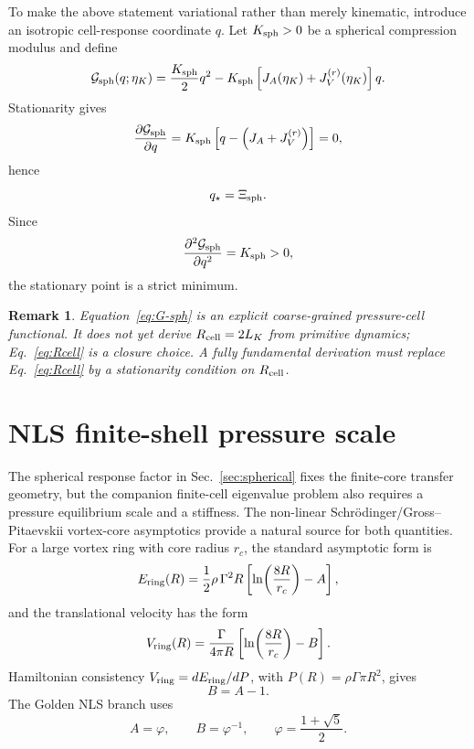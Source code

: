 \documentclass[11pt]{article}
\newcommand{\Xisph}{\Xi_{\rm sph}}
\newtheorem{remark}{Remark}
\begin{document}
To make the above statement variational rather than merely kinematic, introduce an isotropic
cell-response coordinate \(q\).  Let \(K_{\rm sph}>0\) be a spherical compression modulus and
define
\begin{equation}
  \mathcal G_{\rm sph}(q;\eta_K)
  =
  \frac{K_{\rm sph}}{2}q^2
  -
  K_{\rm sph}\left[J_A(\eta_K)+J_V^{(r)}(\eta_K)\right]q.
  \label{eq:G-sph}
\end{equation}
Stationarity gives
\begin{equation}
  \frac{\partial\mathcal G_{\rm sph}}{\partial q}
  =
  K_{\rm sph}
  \left[
  q-\left(J_A+J_V^{(r)}\right)
  \right]
  =
  0,
\end{equation}
hence
\begin{equation}
  q_\star=\Xisph.
\end{equation}
Since
\begin{equation}
  \frac{\partial^2\mathcal G_{\rm sph}}{\partial q^2}=K_{\rm sph}>0,
\end{equation}
the stationary point is a strict minimum.

\begin{remark}
Equation~\eqref{eq:G-sph} is an explicit coarse-grained pressure-cell functional.  It does not
yet derive \(R_{\rm cell}=2L_K\) from primitive dynamics; Eq.~\eqref{eq:Rcell} is a closure
choice.  A fully fundamental derivation must replace Eq.~\eqref{eq:Rcell} by a stationarity
condition on \(R_{\rm cell}\).
\end{remark}


\section{NLS finite-shell pressure scale}
\label{sec:nls-shell}

The spherical response factor in Sec.~\ref{sec:spherical} fixes the finite-core transfer
geometry, but the companion finite-cell eigenvalue problem also requires a pressure
equilibrium scale and a stiffness.  The non-linear Schrödinger/Gross--Pitaevskii vortex-core
asymptotics provide a natural source for both quantities.  For a large vortex ring with core
radius \(r_c\), the standard asymptotic form is
\begin{equation}
  E_{\rm ring}(R)
  =
  \frac{1}{2}\rho\,\Gamma^2 R
  \left[
    \ln\!\left(\frac{8R}{r_c}\right)-A
  \right],
  \label{eq:nls-ring-energy}
\end{equation}
and the translational velocity has the form
\begin{equation}
  V_{\rm ring}(R)
  =
  \frac{\Gamma}{4\pi R}
  \left[
    \ln\!\left(\frac{8R}{r_c}\right)-B
  \right].
  \label{eq:nls-ring-velocity}
\end{equation}
Hamiltonian consistency \(V_{\rm ring}=dE_{\rm ring}/dP\), with
\(P(R)=\rho\Gamma\pi R^2\), gives
\begin{equation}
  B=A-1.
  \label{eq:nls-hamiltonian-constraint}
\end{equation}
The Golden NLS branch uses
\begin{equation}
  A=\varphi,\qquad B=\varphi^{-1},
  \qquad
  \varphi=\frac{1+\sqrt5}{2}.
  \label{eq:golden-branch}
\end{equation}
\end{document}
